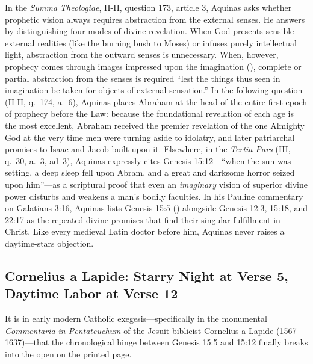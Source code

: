 In the \emph{Summa Theologiae}, II-II, question 173, article 3, Aquinas asks whether prophetic vision always requires abstraction from the external senses. He answers by distinguishing four modes of divine revelation. When God presents sensible external realities (like the burning bush to Moses) or infuses purely intellectual light, abstraction from the outward senses is unnecessary. When, however, prophecy comes through images impressed upon the imagination (), complete or partial abstraction from the senses is required ``lest the things thus seen in imagination be taken for objects of external sensation.'' In the following question (II-II, q.~174, a.~6), Aquinas places Abraham at the head of the entire first epoch of prophecy before the Law: because the foundational revelation of each age is the most excellent, Abraham received the premier revelation of the one Almighty God at the very time men were turning aside to idolatry, and later patriarchal promises to Isaac and Jacob built upon it. Elsewhere, in the \emph{Tertia Pars} (III, q.~30, a.~3, ad~3), Aquinas expressly cites Genesis 15:12---``when the sun was setting, a deep sleep fell upon Abram, and a great and darksome horror seized upon him''---as a scriptural proof that even an \emph{imaginary} vision of superior divine power disturbs and weakens a man's bodily faculties. In his Pauline commentary on Galatians 3:16, Aquinas lists Genesis 15:5 () alongside Genesis 12:3, 15:18, and 22:17 as the repeated divine promises that find their singular fulfillment in Christ. Like every medieval Latin doctor before him, Aquinas never raises a daytime-stars objection.

\subsection{Cornelius a Lapide: Starry Night at Verse 5, Daytime Labor at Verse 12}

It is in early modern Catholic exegesis---specifically in the monumental \emph{Commentaria in Pentateuchum} of the Jesuit biblicist Cornelius a Lapide (1567--1637)---that the chronological hinge between Genesis 15:5 and 15:12 finally breaks into the open on the printed page.

